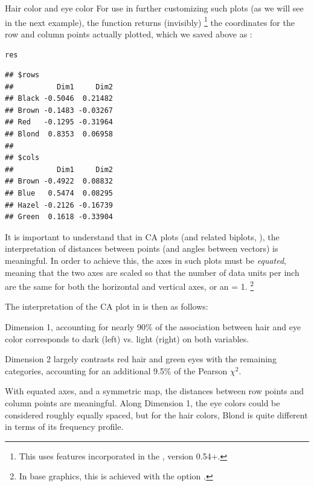 \documentclass[11pt]{book}\usepackage[]{graphicx}\usepackage[]{color}
\makeatletter
\newcommand{\hlstd}[1]{\textcolor[rgb]{0.345,0.345,0.345}{#1}}%
\newenvironment{kframe}{%
 \def\at@end@of@kframe{}%
 \ifinner\ifhmode%
  \def\at@end@of@kframe{\end{minipage}}%
  \begin{minipage}{\columnwidth}%
 \fi\fi%
 \def\FrameCommand##1{\hskip\@totalleftmargin \hskip-\fboxsep
 \colorbox{shadecolor}{##1}\hskip-\fboxsep
     \hskip-\linewidth \hskip-\@totalleftmargin \hskip\columnwidth}%
 \MakeFramed {\advance\hsize-\width
   \@totalleftmargin\z@ \linewidth\hsize
   \@setminipage}}%
 {\par\unskip\endMakeFramed%
 \at@end@of@kframe}
\newenvironment{knitrout}{}{} %
\renewenvironment{knitrout}{\small\renewcommand{\baselinestretch}{.85}}{} %
\makeatother
\begin{document}
\begin{Example}[haireye3]{Hair color and eye color}
For use in further customizing such plots (as we will see in the next example),
the function 
returns (invisibly)%
\footnote{
This uses features incorporated in the , version 0.54+.
}
the coordinates for the row and column points actually plotted,
which we saved above as :
\begin{knitrout}
\color{fgcolor}\begin{kframe}
\begin{alltt}
\hlstd{res}
\end{alltt}
\begin{verbatim}
## $rows
##          Dim1     Dim2
## Black -0.5046  0.21482
## Brown -0.1483 -0.03267
## Red   -0.1295 -0.31964
## Blond  0.8353  0.06958
## 
## $cols
##          Dim1     Dim2
## Brown -0.4922  0.08832
## Blue   0.5474  0.08295
## Hazel -0.2126 -0.16739
## Green  0.1618 -0.33904
\end{verbatim}
\end{kframe}
\end{knitrout}


It is important to understand that in CA plots (and related biplots, ),
the interpretation of distances between points (and angles between vectors)
is meaningful.  In order to achieve this, the axes in such plots must be \emph{equated},
meaning that the two axes are scaled so that the number of data units per inch
are the same for both the horizontal and vertical axes, or an  = 1.%
\footnote{
In base \R graphics, this is achieved with the  option .
}

The interpretation of the CA plot in  is then as follows:
\begin{itemize*}
 \item Dimension 1, accounting for nearly 90\% of the association between
 hair and eye color corresponds to dark (left) vs. light (right) on both variables.
 \item Dimension 2 largely contrasts red hair and green eyes with the remaining categories, accounting for an additional 9.5\% of the Pearson $\chi^2$.
 \item With equated axes, and a symmetric map, the distances between row points and
 column points are meaningful.  Along Dimension 1, the eye colors could be considered
 roughly equally spaced, but for the hair colors, Blond is quite different in terms
 of its frequency profile.
\end{itemize*}
\end{Example}
\end{document}
